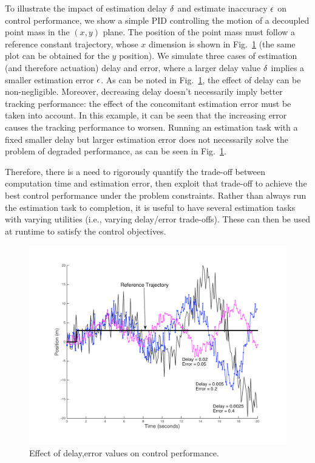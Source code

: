 \begin{exmp}
\label{motivatingExample}
To illustrate the impact of estimation delay $\delta$ and estimate inaccuracy $\epsilon$ on control performance, we show a simple PID controlling the motion of a decoupled point mass in the $(x,y)$ plane.
The position of the point mass must follow a reference constant trajectory, whose $x$ dimension is shown in Fig.~\ref{fig:toyplot} (the same plot can be obtained for the $y$ position).
We simulate three cases of estimation (and therefore actuation) delay and error, where a larger delay value $\delta$ implies a smaller estimation error $\epsilon$.
As can be noted in Fig.~\ref{fig:toyplot}, the effect of delay can be non-negligible.
Moreover, decreasing delay doesn't necessarily imply better tracking performance: the effect of the concomitant estimation error must be taken into account. 
In this example, it can be seen that the increasing error causes the tracking performance to worsen.
Running an estimation task with a fixed smaller delay but larger estimation error does not necessarily solve the problem of degraded performance, as can be seen in Fig.~\ref{fig:toyplot}.

Therefore, there is a need to rigorously quantify the trade-off between computation time and estimation error, then exploit that trade-off to achieve the best control performance under the problem constraints.
Rather than always run the estimation task to completion, it is useful to have several estimation tasks with varying utilities (i.e., varying delay/error trade-offs).
These can then be used at runtime to satisfy the control objectives.
\exmend
\begin{figure}[t]
\centering
\includegraphics[scale=0.3]{figures/toyplot}
\caption{Effect of delay,error values on control performance.}
\label{fig:toyplot}
\end{figure}
\end{exmp}

